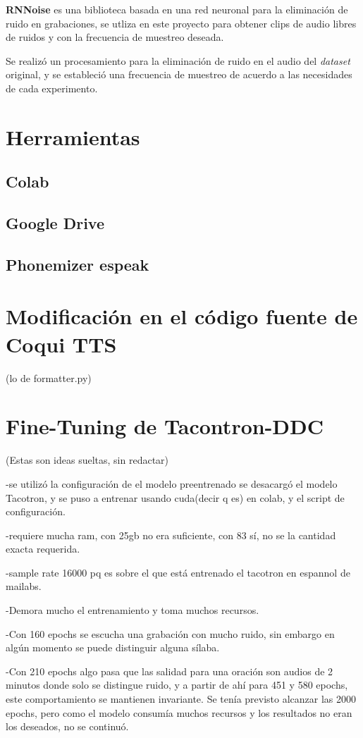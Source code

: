 \textbf{RNNoise} es una biblioteca basada en una red neuronal para la eliminación de ruido en grabaciones, se utliza en este proyecto para obtener clips de audio libres de ruidos y con la frecuencia de muestreo deseada.

Se realizó un procesamiento para la eliminación de ruido en el audio del \textit{dataset} original, y se estableció una frecuencia de muestreo de acuerdo a las necesidades de cada experimento. 

\section{Herramientas}
\subsection{Colab}
\subsection{Google Drive}
\subsection{Phonemizer espeak}

\section{Modificación en el código fuente de Coqui TTS}
(lo de formatter.py)

\section{Fine-Tuning de Tacontron-DDC}
(Estas son ideas sueltas, sin redactar)

-se utilizó la configuración de el modelo preentrenado
se desacargó el modelo Tacotron, y se puso a entrenar usando cuda(decir q es) en colab, y el script de configuración.

-requiere mucha ram, con 25gb no era suficiente, con 83 sí, no se la cantidad exacta requerida.

-sample rate 16000 pq es sobre el que está entrenado el tacotron en espannol de mailabs.

-Demora mucho el entrenamiento y toma muchos recursos.

-Con 160 epochs se escucha una grabación con mucho ruido, sin embargo en algún momento se puede distinguir alguna sílaba.

-Con 210 epochs algo pasa que las salidad para una oración son audios de 2 minutos donde solo se distingue ruido, y a partir de ahí para 451 y 580 epochs, este comportamiento se mantienen invariante. Se tenía previsto alcanzar las 2000 epochs, pero como el modelo consumía muchos recursos y los resultados no eran los deseados, no se continuó.

